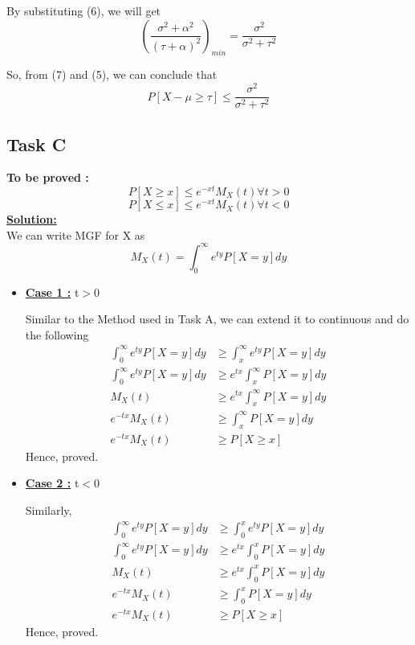 \documentclass[12pt]{article}
\begin{document}
By substituting (6), we will get
\begin{equation}
    (\frac{\sigma^2+\alpha^2}{(\tau+\alpha)^2})_{min} = \frac{\sigma^2}{\sigma^2+\tau^2}
\end{equation}

So, from (7) and (5), we can conclude that
\begin{equation}
    P[X-\mu \geq \tau] \leq \frac{\sigma^2}{\sigma^2+\tau^2}
\end{equation}

\subsection{Task C}
\textbf{To be proved :}
\begin{equation}
    P[X\geq x] \leq e^{-xt}M_X(t) \forall t>0
\end{equation}
\begin{equation}
    P[X\leq x] \leq e^{-xt}M_X(t) \forall t<0
\end{equation}
\textbf{\underline{Solution:}}\\
We can write MGF for X as
\begin{equation}
    M_X(t) = \int_0^\infty e^{ty}P[X=y]dy 
\end{equation}

\begin{itemize}
    \item \underline{\textbf{Case 1 :}} t$>$0

Similar to the Method used in Task A, we can extend it to continuous and do the following
\begin{equation}
\begin{split}
    \int_0^\infty e^{ty}P[X=y]dy& \geq \int_x^\infty e^{ty}P[X=y]dy \\
    \int_0^\infty e^{ty}P[X=y]dy& \geq e^{tx}\int_x^\infty P[X=y]dy \\
    M_X(t)& \geq e^{tx}\int_x^\infty P[X=y]dy \\
    e^{-tx}M_X(t)& \geq \int_x^\infty P[X=y]dy \\
    e^{-tx}M_X(t)& \geq P[X\geq x]
\end{split}
\end{equation}
Hence, proved.
    \item \underline{\textbf{Case 2 :}} t$<$0

Similarly,
\begin{equation}
\begin{split}
    \int_0^\infty e^{ty}P[X=y]dy& \geq \int_0^x e^{ty}P[X=y]dy \\
    \int_0^\infty e^{ty}P[X=y]dy& \geq e^{tx}\int_0^x P[X=y]dy \\
    M_X(t)& \geq e^{tx}\int_0^x P[X=y]dy \\
    e^{-tx}M_X(t)& \geq \int_0^x P[X=y]dy \\
    e^{-tx}M_X(t)& \geq P[X\geq x]
\end{split}
\end{equation}
Hence, proved.
\end{itemize}
\end{document}
